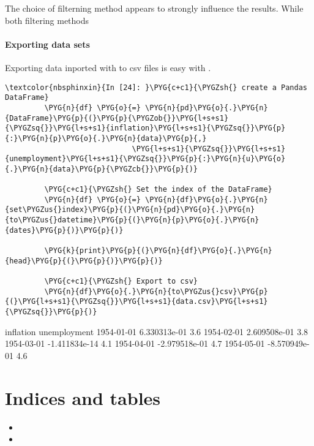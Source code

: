 \documentclass[letterpaper,10pt,openany,oneside,english]{sphinxmanual}
\begin{document}
The choice of filterning method appears to strongly influence the
results. While both filtering methods


\subsubsection{Exporting data sets}
\label{\detokenize{fredpy_examples:Exporting-data-sets}}
Exporting data inported with  to csv files is easy with
.

%
\begin{Verbatim}[commandchars=\\\{\}]
\textcolor{nbsphinxin}{In [24]: }\PYG{c+c1}{\PYGZsh{} create a Pandas DataFrame}
         \PYG{n}{df} \PYG{o}{=} \PYG{n}{pd}\PYG{o}{.}\PYG{n}{DataFrame}\PYG{p}{(}\PYG{p}{\PYGZob{}}\PYG{l+s+s1}{\PYGZsq{}}\PYG{l+s+s1}{inflation}\PYG{l+s+s1}{\PYGZsq{}}\PYG{p}{:}\PYG{n}{p}\PYG{o}{.}\PYG{n}{data}\PYG{p}{,}
                             \PYG{l+s+s1}{\PYGZsq{}}\PYG{l+s+s1}{unemployment}\PYG{l+s+s1}{\PYGZsq{}}\PYG{p}{:}\PYG{n}{u}\PYG{o}{.}\PYG{n}{data}\PYG{p}{\PYGZcb{}}\PYG{p}{)}
         
         \PYG{c+c1}{\PYGZsh{} Set the index of the DataFrame}
         \PYG{n}{df} \PYG{o}{=} \PYG{n}{df}\PYG{o}{.}\PYG{n}{set\PYGZus{}index}\PYG{p}{(}\PYG{n}{pd}\PYG{o}{.}\PYG{n}{to\PYGZus{}datetime}\PYG{p}{(}\PYG{n}{p}\PYG{o}{.}\PYG{n}{dates}\PYG{p}{)}\PYG{p}{)}
         
         \PYG{k}{print}\PYG{p}{(}\PYG{n}{df}\PYG{o}{.}\PYG{n}{head}\PYG{p}{(}\PYG{p}{)}\PYG{p}{)}
         
         \PYG{c+c1}{\PYGZsh{} Export to csv}
         \PYG{n}{df}\PYG{o}{.}\PYG{n}{to\PYGZus{}csv}\PYG{p}{(}\PYG{l+s+s1}{\PYGZsq{}}\PYG{l+s+s1}{data.csv}\PYG{l+s+s1}{\PYGZsq{}}\PYG{p}{)}
\end{Verbatim}



%
\begin{OriginalVerbatim}[commandchars=\\\{\}]
               inflation  unemployment
1954-01-01  6.330313e-01           3.6
1954-02-01  2.609508e-01           3.8
1954-03-01 -1.411834e-14           4.1
1954-04-01 -2.979518e-01           4.7
1954-05-01 -8.570949e-01           4.6
\end{OriginalVerbatim}
\relax


\chapter{Indices and tables}
\label{\detokenize{index:indices-and-tables}}\begin{itemize}
\item {} 

\item {} 

\end{itemize}



\renewcommand{\indexname}{Index}
\printindex
\end{document}
